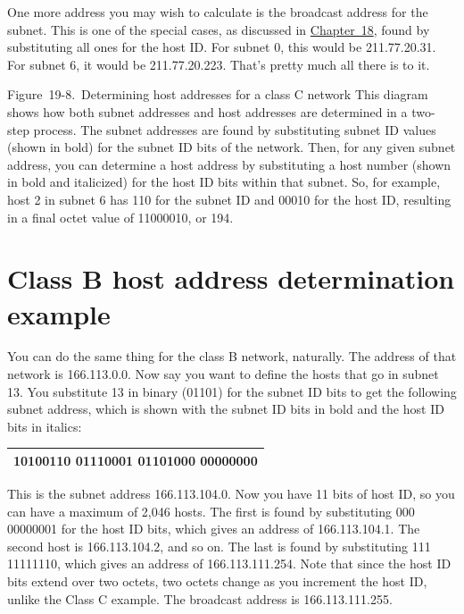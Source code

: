 One more address you may wish to calculate is the broadcast address for
the subnet. This is one of the special cases, as discussed in
\protect\hyperlink{ch18.html}{Chapter~18}, found by substituting all
ones for the host ID. For subnet 0, this would be 211.77.20.31. For
subnet 6, it would be 211.77.20.223. That's pretty much all there is to
it.

 

 

Figure~19-8.~Determining host addresses for a class C network This
diagram shows how both subnet addresses and host addresses are
determined in a two-step process. The subnet addresses are found by
substituting subnet ID values (shown in bold) for the subnet ID bits of
the network. Then, for any given subnet address, you can determine a
host address by substituting a host number (shown in bold and
italicized) for the host ID bits within that subnet. So, for example,
host 2 in subnet 6 has 110 for the subnet ID and 00010 for the host ID,
resulting in a final octet value of 11000010, or 194.

\section{Class B host address determination example}

 You can do
the same thing for the class B network, naturally. The address of that
network is 166.113.0.0. Now say you want to define the hosts that go in
subnet 13. You substitute 13 in binary (01101) for the subnet ID bits to
get the following subnet address, which is shown with the subnet ID bits
in bold and the host ID bits in italics:

\begin{longtable}[]{@{}l@{}}
\toprule
\endhead
10100110 01110001 {\textbf{01101}}{000 00000000}\tabularnewline
\bottomrule
\end{longtable}

This is the subnet address 166.113.104.0. Now you have 11 bits of host
ID, so you can have a maximum of 2,046 hosts. The first is found by
substituting 000 00000001 for the host ID bits, which gives an address
of 166.113.104.1. The second host is 166.113.104.2, and so on. The last
is found by substituting 111 11111110, which gives an address of
166.113.111.254. Note that since the host ID bits extend over two
octets, two octets change as you increment the host ID, unlike the Class
C example. The broadcast address is 166.113.111.255.


